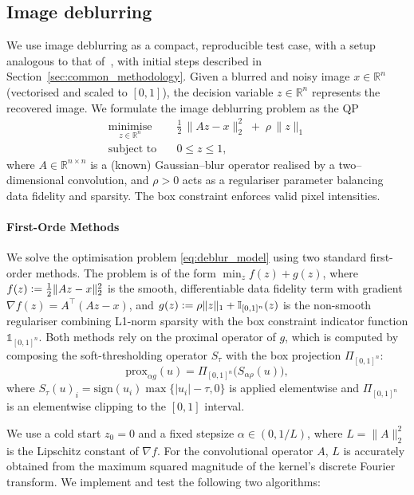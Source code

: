 \subsection{Image deblurring}
\label{subsubsec:image_deblurring}
We use image deblurring as a compact, reproducible test case, with a setup analogous to that of~\cite[Section 8.1.1]{RSBS25}, with initial steps described in Section~\ref{sec:common_methodology}. Given a blurred and noisy image $x\in\mathbb{R}^n$ (vectorised and scaled to $[0,1]$), the decision variable $z\in\mathbb{R}^n$ represents the recovered image. We formulate the image deblurring problem as the QP
\begin{equation}
\label{eq:deblur_model}
\begin{aligned}
\underset{z\in\mathbb{R}^n}{\text{minimise}}\quad & \tfrac{1}{2}\,\|Az-x\|_2^2 \;+\; \rho\,\|z\|_1 \\
\text{subject to}\quad & 0 \le z \le 1 ,
\end{aligned}
\end{equation}
where $A\in\mathbb{R}^{n\times n}$ is a (known) Gaussian–blur operator realised by a two–dimensional convolution, and $\rho>0$ acts as a regulariser parameter balancing data fidelity and sparsity. The box constraint enforces valid pixel intensities.

\paragraph{First-Orde Methods}
We solve the optimisation problem \eqref{eq:deblur_model} using two standard first-order methods. The problem is of the form $\min_z f(z) + g(z)$, where $f(z) \vcentcolon= \tfrac{1}{2}\|Az-x\|_2^2$ is the smooth, differentiable data fidelity term with gradient $\nabla f(z) = A^\top(Az-x)$, and $g(z) \vcentcolon= \rho\|z\|_1 + \mathbb{I}_{[0,1]^n}(z)$ is the non-smooth regulariser combining L1-norm sparsity with the box constraint indicator function $\mathbb{1}_{[0,1]^n}$.
Both methods rely on the proximal operator of $g$, which is computed by composing the soft-thresholding operator $S_{\tau}$ with the box projection $\Pi_{[0,1]^n}$:
\[
\mathrm{prox}_{\alpha g}(u) = \Pi_{[0,1]^n}\!\Big(S_{\alpha\rho}(u)\Big),
\]
where $S_{\tau}(u)_i=\mathrm{sign}(u_i)\max\{|u_i|-\tau,0\}$ is applied elementwise and $\Pi_{[0,1]^n}$ is an elementwise clipping to the $[0,1]$ interval.

We use a cold start $z_0=0$ and a fixed stepsize $\alpha\in(0,1/L)$, where $L=\|A\|_2^2$ is the Lipschitz constant of $\nabla f$. For the convolutional operator $A$, $L$ is accurately obtained from the maximum squared magnitude of the kernel’s discrete Fourier transform. We implement and test the following two algorithms:

